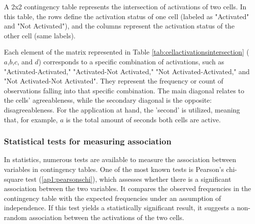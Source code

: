 A 2x2 contingency table represents the intersection of activations of two cells. In this table, the rows define the activation status of one cell (labeled as "Activated" and "Not Activated"), and the columns represent the activation status of the other cell (same labels).

\begin{table}[h!]
    \centering
    \caption{Contigency table representing the activation intersection of two cells.}
    \label{tab:cellactivationsintersection}
\end{table}

Each element of the matrix represented in Table \ref{tab:cellactivationsintersection} ($a$,$b$,$c$, and $d$) corresponds to a specific combination of activations, such as "Activated-Activated," "Activated-Not Activated," "Not Activated-Activated," and "Not Activated-Not Activated". They represent the frequency or count of observations falling into that specific combination. The main diagonal relates to the cells' agreeableness, while the secondary diagonal is the opposite: disagreeableness. For the application at hand, the 'second' is utilized, meaning that, for example, $a$ is the total amount of seconds both cells are active.

\subsubsection{Statistical tests for measuring association}

In statistics, numerous tests are available to measure the association between variables in contingency tables. One of the most known tests is Pearson's chi-square test (\ref{ap1:pearsonschi}), which assesses whether there is a significant association between the two variables. It compares the observed frequencies in the contingency table with the expected frequencies under an assumption of independence. If this test yields a statistically significant result, it suggests a non-random association between the activations of the two cells.

